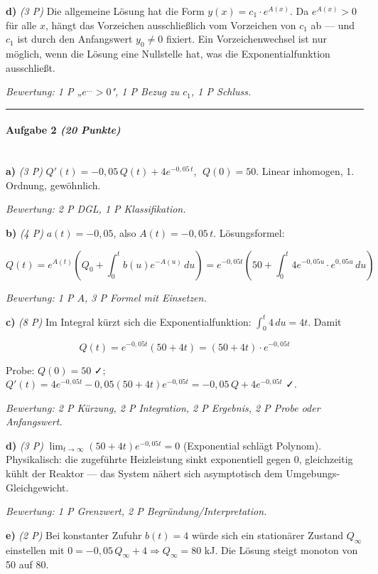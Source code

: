 \documentclass[11pt, a4paper]{article}
\begin{document}
\textbf{d)} \textit{(3 P)} Die allgemeine Lösung hat die Form $y(x) = c_1 \cdot e^{A(x)}$. Da $e^{A(x)} > 0$ für alle $x$, hängt das Vorzeichen ausschließlich vom Vorzeichen von $c_1$ ab — und $c_1$ ist durch den Anfangswert $y_0 \neq 0$ fixiert. Ein Vorzeichenwechsel ist nur möglich, wenn die Lösung eine Nullstelle hat, was die Exponentialfunktion ausschließt.

\textit{Bewertung: 1 P „$e^{...}>0$", 1 P Bezug zu $c_1$, 1 P Schluss.}



\noindent\textcolor{rulegray}{\rule{\linewidth}{0.4pt}}


\paragraph{Aufgabe 2 \textit{(20 Punkte)}}\mbox{}\\[2pt]

\textbf{a)} \textit{(3 P)} $Q'(t) = -0{,}05\,Q(t) + 4 e^{-0{,}05\,t}$, $\;Q(0) = 50$. Linear inhomogen, 1. Ordnung, gewöhnlich.

\textit{Bewertung: 2 P DGL, 1 P Klassifikation.}


\textbf{b)} \textit{(4 P)} $a(t) = -0{,}05$, also $A(t) = -0{,}05\,t$. Lösungsformel:

\[
Q(t) = e^{A(t)}\left(Q_0 + \int_0^t b(u) e^{-A(u)}\,du\right) = e^{-0{,}05 t}\left(50 + \int_0^t 4 e^{-0{,}05 u} \cdot e^{0{,}05 u}\,du\right)
\]

\textit{Bewertung: 1 P $A$, 3 P Formel mit Einsetzen.}


\textbf{c)} \textit{(8 P)} Im Integral kürzt sich die Exponentialfunktion: $\int_0^t 4\,du = 4t$. Damit

\[
Q(t) = e^{-0{,}05 t}(50 + 4t) = (50 + 4t)\cdot e^{-0{,}05 t}
\]

Probe: $Q(0) = 50$ ✓; $Q'(t) = 4 e^{-0{,}05 t} - 0{,}05 (50+4t) e^{-0{,}05 t} = -0{,}05\,Q + 4 e^{-0{,}05 t}$ ✓.

\textit{Bewertung: 2 P Kürzung, 2 P Integration, 2 P Ergebnis, 2 P Probe oder Anfangswert.}


\textbf{d)} \textit{(3 P)} $\lim_{t\to\infty} (50+4t) e^{-0{,}05 t} = 0$ (Exponential schlägt Polynom). Physikalisch: die zugeführte Heizleistung sinkt exponentiell gegen 0, gleichzeitig kühlt der Reaktor — das System nähert sich asymptotisch dem Umgebungs-Gleichgewicht.

\textit{Bewertung: 1 P Grenzwert, 2 P Begründung/Interpretation.}


\textbf{e)} \textit{(2 P)} Bei konstanter Zufuhr $b(t)=4$ würde sich ein stationärer Zustand $Q_\infty$ einstellen mit $0 = -0{,}05\,Q_\infty + 4 \Rightarrow Q_\infty = 80$ kJ. Die Lösung steigt monoton von 50 auf 80.
\end{document}
